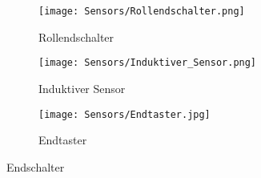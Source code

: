 \begin{figure}[H]
    \centering
    \begin{subfigure}{.3\textwidth}
        \centering
        \texttt{[image: Sensors/Rollendschalter.png]}
        \caption{Rollendschalter \cite{schmersal_pic}}
        \label{roll_sens}
    \end{subfigure}%
    \begin{subfigure}{.3\textwidth}
        \centering
        \texttt{[image: Sensors/Induktiver\_Sensor.png]}
        \caption{Induktiver Sensor \cite{induktiv_sensor}}
        \label{ind_sens}
    \end{subfigure}%
    \begin{subfigure}{.3\textwidth}
        \centering
        \texttt{[image: Sensors/Endtaster.jpg]}
        \caption{Endtaster}
        \label{tast_sens}
    \end{subfigure}
    \caption{Endschalter}
\end{figure}

